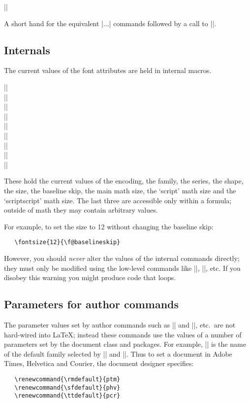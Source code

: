 \documentclass{ltxguide}[1995/11/28]
\begin{document}
\begin{decl}
  |\usefont|    
\end{decl}
A short hand for the equivalent |\font...| commands followed by a call
to |\selectfont|.

\subsection{Internals}

The current values of the font attributes are held in internal macros.

\begin{decl}
  |\f@encoding| \\
  |\f@family| \\
  |\f@series| \\
  |\f@shape|  \\
  |\f@size| \\
  |\f@baselineskip| \\
  |\tf@size| \\
  |\sf@size| \\
  |\ssf@size|
\end{decl}

These hold the current values of the encoding, the family, the series,
the shape, the size, the baseline skip, the main math size, the `script'
math size and the `scriptscript' math size. The last three are
accessible only within a formula; outside of math they may contain
arbitrary values.

For example, to set the size to 12 without changing the baseline skip:
\begin{verbatim}
   \fontsize{12}{\f@baselineskip}
\end{verbatim}
However, you should \emph{never} alter the values of the internal
commands directly; they must only be modified using the low-level
commands like |\fontfamily|, |\fontseries|, etc. If you disobey this
warning you might produce code that loops.

\subsection{Parameters for author commands}
\label{Sec:text.param}

The parameter values set by author commands such as |\textrm| and
|\rmfamily|, etc.\ are not hard-wired into \LaTeX; instead these
commands use the values of a number of parameters set by the document
class and packages.  For example, |\rmdefault| is the name of the
default family selected by |\textrm| and |\rmfamily|. Thus to set a
document in Adobe Times, Helvetica and Courier, the document designer
specifies:
\begin{verbatim}
   \renewcommand{\rmdefault}{ptm}
   \renewcommand{\sfdefault}{phv}
   \renewcommand{\ttdefault}{pcr}
\end{verbatim}
\end{document}

